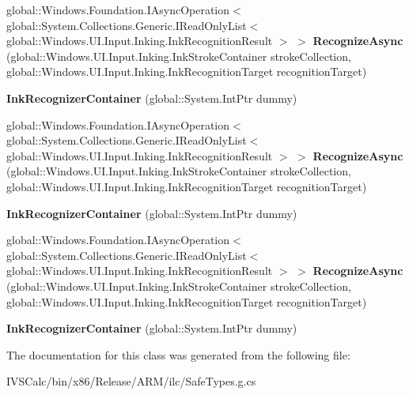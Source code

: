 \begin{DoxyCompactItemize}
global\+::\+Windows.\+Foundation.\+I\+Async\+Operation$<$ global\+::\+System.\+Collections.\+Generic.\+I\+Read\+Only\+List$<$ global\+::\+Windows.\+U\+I.\+Input.\+Inking.\+Ink\+Recognition\+Result $>$ $>$ {\bfseries Recognize\+Async} (global\+::\+Windows.\+U\+I.\+Input.\+Inking.\+Ink\+Stroke\+Container stroke\+Collection, global\+::\+Windows.\+U\+I.\+Input.\+Inking.\+Ink\+Recognition\+Target recognition\+Target)
\item 
\mbox{\label{class_windows_1_1_u_i_1_1_input_1_1_inking_1_1_ink_recognizer_container_a9ccc23f7cda60be5d7638b6d3d12400f}} 
{\bfseries Ink\+Recognizer\+Container} (global\+::\+System.\+Int\+Ptr dummy)
\item 
\mbox{\label{class_windows_1_1_u_i_1_1_input_1_1_inking_1_1_ink_recognizer_container_abab854db5f283434d57a1f4170f14769}} 
global\+::\+Windows.\+Foundation.\+I\+Async\+Operation$<$ global\+::\+System.\+Collections.\+Generic.\+I\+Read\+Only\+List$<$ global\+::\+Windows.\+U\+I.\+Input.\+Inking.\+Ink\+Recognition\+Result $>$ $>$ {\bfseries Recognize\+Async} (global\+::\+Windows.\+U\+I.\+Input.\+Inking.\+Ink\+Stroke\+Container stroke\+Collection, global\+::\+Windows.\+U\+I.\+Input.\+Inking.\+Ink\+Recognition\+Target recognition\+Target)
\item 
\mbox{\label{class_windows_1_1_u_i_1_1_input_1_1_inking_1_1_ink_recognizer_container_a9ccc23f7cda60be5d7638b6d3d12400f}} 
{\bfseries Ink\+Recognizer\+Container} (global\+::\+System.\+Int\+Ptr dummy)
\item 
\mbox{\label{class_windows_1_1_u_i_1_1_input_1_1_inking_1_1_ink_recognizer_container_abab854db5f283434d57a1f4170f14769}} 
global\+::\+Windows.\+Foundation.\+I\+Async\+Operation$<$ global\+::\+System.\+Collections.\+Generic.\+I\+Read\+Only\+List$<$ global\+::\+Windows.\+U\+I.\+Input.\+Inking.\+Ink\+Recognition\+Result $>$ $>$ {\bfseries Recognize\+Async} (global\+::\+Windows.\+U\+I.\+Input.\+Inking.\+Ink\+Stroke\+Container stroke\+Collection, global\+::\+Windows.\+U\+I.\+Input.\+Inking.\+Ink\+Recognition\+Target recognition\+Target)
\item 
\mbox{\label{class_windows_1_1_u_i_1_1_input_1_1_inking_1_1_ink_recognizer_container_a9ccc23f7cda60be5d7638b6d3d12400f}} 
{\bfseries Ink\+Recognizer\+Container} (global\+::\+System.\+Int\+Ptr dummy)
\end{DoxyCompactItemize}


The documentation for this class was generated from the following file\+:\begin{DoxyCompactItemize}
\item 
I\+V\+S\+Calc/bin/x86/\+Release/\+A\+R\+M/ilc/Safe\+Types.\+g.\+cs\end{DoxyCompactItemize}
